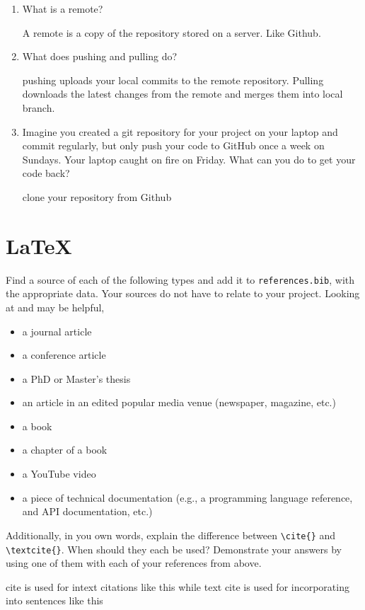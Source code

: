\documentclass[10pt,twocolumn]{article}
\begin{document}
\begin{enumerate}
\item What is a remote?

A remote is a copy of the repository stored on a server. Like Github.

\item What does pushing and pulling do?

pushing uploads your local commits to the remote repository. Pulling downloads the latest changes from the remote and merges them into local branch. 


\item Imagine you created a git repository for your project on your laptop and commit regularly, but only push your code to GitHub once a week on Sundays. Your laptop caught on fire on Friday. What can you do to get your code back?

clone your repository from Github 

\end{enumerate}

\section{\LaTeX}

Find a source of each of the following types and add it to \texttt{references.bib}, with the appropriate data. Your sources do not have to relate to your project. Looking at \textcite{OverleafBibliographyManagement} and \textcite{WikipediaBibtex} may be helpful,

\begin{itemize}
\item a journal article
\cite{gupta_distraction_2019}
\item a conference article
\cite{li_pm4music_2024}
\item a PhD or Master's thesis
\cite{usher_visualization_2023}
\item an article in an edited popular media venue (newspaper, magazine, etc.)
\item a book
\cite{payling_electronic_2023}
\item a chapter of a book
\item a YouTube video
\cite{pypahs_art_50_2017}
\item a piece of technical documentation (e.g., a programming language reference, and API documentation, etc.)
\cite{noauthor_canvas_2024}
\end{itemize}

Additionally, in you own words, explain the difference between \texttt{{\textbackslash}cite\{\}} and \texttt{{\textbackslash}textcite\{\}}. When should they each be used? Demonstrate your answers by using one of them with each of your references from above.

cite  is used for intext citations like this \cite{beigi_fundamentals_2011} while text cite is used for incorporating into sentences like this \textcite{beigi_fundamentals_2011}

\printbibliography
\end{document}
